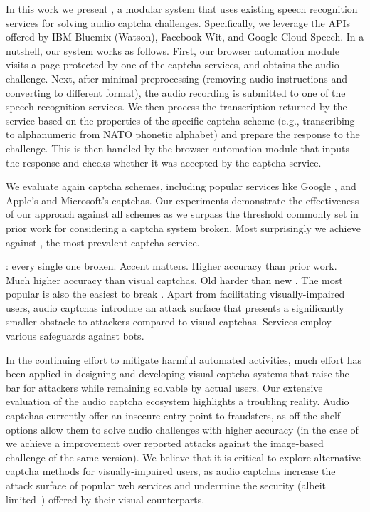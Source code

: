 In this work we present \system, a modular system that uses existing speech recognition services
for solving audio captcha challenges. Specifically, we leverage the
APIs offered by IBM Bluemix (Watson), Facebook Wit, and Google Cloud Speech. In a nutshell, our system works as
follows. First, our browser automation module visits a page protected by one of the captcha services,
and obtains the audio challenge. Next, after minimal preprocessing (removing audio instructions and 
converting to different format), the audio recording is submitted 
to one of the speech recognition services. We then process the transcription returned by the service
based on the properties of the specific captcha scheme (e.g., transcribing to alphanumeric 
from NATO phonetic alphabet) and prepare the response to the challenge. This is then handled by
the browser automation module that inputs the response and checks whether it was accepted by the captcha
service.

We evaluate \system again \no captcha schemes, including popular services like Google \re,
and Apple's and Microsoft's captchas. Our experiments demonstrate the effectiveness of our approach
against all schemes as we surpass the threshold commonly set in prior work for considering
a captcha system broken. Most surprisingly we achieve  against \re, 
the most prevalent captcha service.

: every single one broken. Accent matters. Higher accuracy than prior work. Much higher accuracy than
visual captchas. Old \re harder than new \re. The most popular is also the easiest to break .
Apart from facilitating visually-impaired users, audio captchas introduce an attack
surface that presents a significantly smaller obstacle to attackers compared to visual captchas.
Services employ various safeguards against bots.

In the continuing effort to mitigate harmful automated activities, much effort has been applied in 
designing and developing visual captcha systems that raise the bar for attackers while remaining 
solvable by actual users. Our extensive evaluation of the audio captcha ecosystem highlights
a troubling reality. Audio captchas currently offer an insecure entry point to fraudsters,
as off-the-shelf options allow them to solve audio challenges with higher accuracy (in the case of \re
we achieve a  improvement over reported attacks against the image-based challenge of the same version).
We believe that it is critical to explore alternative captcha methods for visually-impaired users,
as audio captchas increase the attack surface of popular web services and undermine the security
(albeit limited~\cite{185128,sivakorn:eurosp16}) offered by their visual counterparts.

